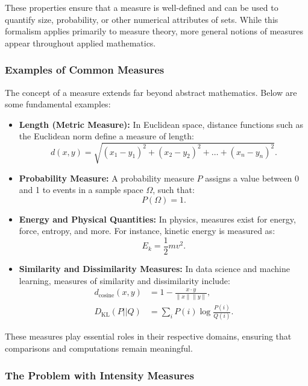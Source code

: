 These properties ensure that a measure is well-defined and can be used to quantify size, probability, or other numerical attributes of sets. While this formalism applies primarily to measure theory, more general notions of measures appear throughout applied mathematics.


\subsubsection{Examples of Common Measures}

The concept of a measure extends far beyond abstract mathematics. Below are some fundamental examples:

\begin{itemize}
    \item \textbf{Length (Metric Measure):} In Euclidean space, distance functions such as the Euclidean norm define a measure of length:
    \[
    d(x, y) = \sqrt{(x_1 - y_1)^2 + (x_2 - y_2)^2 + \dots + (x_n - y_n)^2}.
    \]
    \item \textbf{Probability Measure:} A probability measure \( P \) assigns a value between 0 and 1 to events in a sample space \( \Omega \), such that:
    \[
    P(\Omega) = 1.
    \]
    \item \textbf{Energy and Physical Quantities:} In physics, measures exist for energy, force, entropy, and more. For instance, kinetic energy is measured as:
    \[
    E_k = \frac{1}{2} m v^2.
    \]
    \item \textbf{Similarity and Dissimilarity Measures:} In data science and machine learning, measures of similarity and dissimilarity include:
    \begin{align}
        d_{\text{cosine}}(x, y) &= 1 - \frac{x \cdot y}{\|x\| \|y\|}, \\
        D_{\text{KL}}(P || Q) &= \sum_i P(i) \log \frac{P(i)}{Q(i)}.
    \end{align}
\end{itemize}

These measures play essential roles in their respective domains, ensuring that comparisons and computations remain meaningful.

\subsubsection{The Problem with Intensity Measures}


